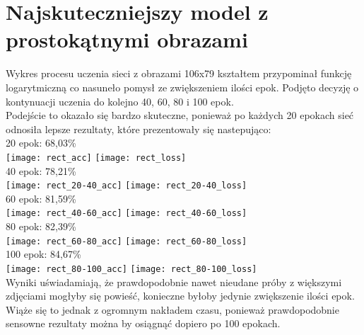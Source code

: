 \section{Najskuteczniejszy model z prostokątnymi obrazami}
Wykres procesu uczenia sieci z obrazami 106x79 kształtem przypominał funkcję logarytmiczną
co nasuneło pomysł ze zwiększeniem ilości epok. Podjęto decyzję o kontynuacji uczenia
do kolejno 40, 60, 80 i 100 epok.\\
Podejście to okazało się bardzo skuteczne, ponieważ po każdych 20 epokach
sieć odnosiła lepsze rezultaty, które prezentowały się nastepująco:\\
20 epok: 68,03\%\\
\texttt{[image: rect\_acc]}
\texttt{[image: rect\_loss]}\\
40 epok: 78,21\%\\
\texttt{[image: rect\_20-40\_acc]}
\texttt{[image: rect\_20-40\_loss]}\\
60 epok: 81,59\%\\
\texttt{[image: rect\_40-60\_acc]}
\texttt{[image: rect\_40-60\_loss]}\\
80 epok: 82,39\%\\
\texttt{[image: rect\_60-80\_acc]}
\texttt{[image: rect\_60-80\_loss]}\\
100 epok: 84,67\%\\
\texttt{[image: rect\_80-100\_acc]}
\texttt{[image: rect\_80-100\_loss]}\\
Wyniki uświadamiają, że prawdopodobnie nawet nieudane próby z większymi zdjęciami
mogłyby się powieść, konieczne byłoby jedynie zwiększenie ilości epok. Wiąże się to jednak
z ogromnym nakładem czasu, ponieważ prawdopodobnie sensowne rezultaty można by osiągnąć
dopiero po 100 epokach.
